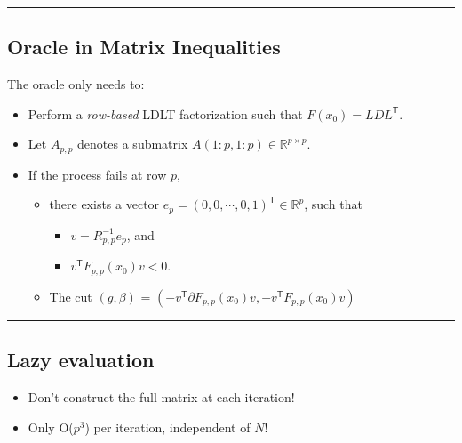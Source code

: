 \documentclass[
]{article}
\providecommand{\tightlist}{%
  \setlength{\itemsep}{0pt}\setlength{\parskip}{0pt}}
\begin{document}
\begin{center}\rule{0.5\linewidth}{0.5pt}\end{center}

\subsection{Oracle in Matrix
Inequalities}\label{oracle-in-matrix-inequalities}

The oracle only needs to:

\begin{itemize}
\tightlist
\item
  Perform a \emph{row-based} LDLT factorization such that
  \(F(x_0) = L D L^\mathsf{T}\).
\item
  Let \(A_{p,p}\) denotes a submatrix
  \(A(1:p, 1:p) \in \mathbb{R}^{p\times p}\).
\item
  If the process fails at row \(p\),

  \begin{itemize}
  \tightlist
  \item
    there exists a vector
    \(e_p = (0, 0, \cdots, 0, 1)^\mathsf{T} \in \mathbb{R}^p\), such
    that

    \begin{itemize}
    \tightlist
    \item
      \(v = R_{p,p}^{-1} e_p\), and
    \item
      \(v^\mathsf{T} F_{p,p}(x_0) v < 0\).
    \end{itemize}
  \item
    The cut \((g, \beta)\) =
    \((-v^\mathsf{T} \partial F_{p,p}(x_0) v, -v^\mathsf{T} F_{p,p}(x_0) v)\)
  \end{itemize}
\end{itemize}

\begin{center}\rule{0.5\linewidth}{0.5pt}\end{center}

\subsection{Lazy evaluation}\label{lazy-evaluation}

\begin{itemize}
\item
  Don't construct the full matrix at each iteration!
\item
  Only O(\(p^3\)) per iteration, independent of \(N\)!
\end{itemize}
\end{document}
